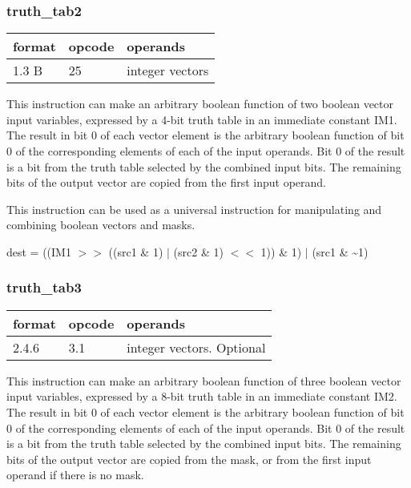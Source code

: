 \documentclass[forwardcom.tex]{subfiles}
\begin{document}
\subsubsection{truth\_tab2}
\label{table:truthTab2Instruction}
\begin{tabular}{|p{12mm}|p{12mm}|p{110mm}|}
\hline
\bfseries format & \bfseries opcode & \bfseries operands \\ \hline
1.3 B & 25 & integer vectors \\ \hline
\end{tabular}
\vspace{2mm}

This instruction can make an arbitrary boolean function of two boolean vector input variables, expressed by a 4-bit truth table in an immediate constant IM1. The result in bit 0 of each vector element is the arbitrary boolean function of bit 0 of the corresponding elements of each of the input operands. Bit 0 of the result is a bit from the truth table selected by the combined input bits. The remaining bits of the output vector are copied from the first input operand. 
\vspace{2mm}

This instruction can be used as a universal instruction for manipulating and combining boolean vectors and masks.
\vspace{2mm}

dest = ((IM1 $>>$ ((src1 \& 1) $|$ (src2 \& 1) $<<$ 1)) \& 1) $|$ (src1 \& \~{}1)

\subsubsection{truth\_tab3}
\label{table:truthTab3Instruction}
\begin{tabular}{|p{12mm}|p{12mm}|p{110mm}|}
\hline
\bfseries format & \bfseries opcode & \bfseries operands \\ \hline
2.4.6 & 3.1 & integer vectors. Optional \\ \hline
\end{tabular}
\vspace{2mm}

This instruction can make an arbitrary boolean function of three boolean vector input variables, expressed by a 8-bit truth table in an immediate constant IM2. The result in bit 0 of each vector element is the arbitrary boolean function of bit 0 of the corresponding elements of each of the input operands. Bit 0 of the result is a bit from the truth table selected by the combined input bits. The remaining bits of the output vector are copied from the mask, or from the first input operand if there is no mask.
\vspace{2mm}
\end{document}
